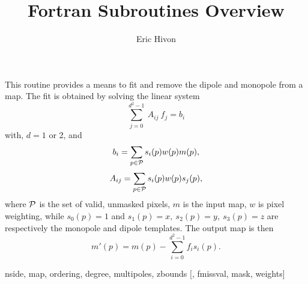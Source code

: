 
\sloppy


\title{\healpix Fortran Subroutines Overview}
 \section[remove\_dipole*]{ }
\label{sub:remove_dipole}
\author{Eric Hivon}
\newcommand{\vecf}{{\rm{ \bf f}}}
\newcommand{\vecb}{{\rm{ \bf b}}}
\newcommand{\matA}{{\rm{ \bf A}}}
\newcommand{\calP}{\cal{P}}

\begin{facility}
{This routine provides a means to fit and remove the dipole and monopole
from a \healpix map. The fit is obtained by solving the linear system
\begin{equation}
	\sum_{j=0}^{d^2-1}\ A_{ij}\ f_j = b_i
\end{equation}
 with, $d=1$ or 2, and
\begin{equation}
	b_i = \sum_{p \in \calP} s_i(p) w(p) m(p),
\end{equation}
\begin{equation}
	A_{ij} = \sum_{p \in \calP} s_i(p) w(p) s_j(p),
\end{equation}
 where $\calP$ is the set of
valid, unmasked pixels, $m$ is the input map, $w$ is pixel weighting, while
$s_0(p) = 1$ and $s_1(p)=x,\ s_2(p)=y,\ s_3(p)=z$ are
respectively the monopole and dipole templates. The output map is then
\begin{equation}
	m'(p) = m(p) - \sum_{i=0}^{d^2-1} f_i s_i(p).
\end{equation}
}
{\modPixTools}
\end{facility}

\begin{f90format}
{nside, map, ordering, degree, multipoles, zbounds [, fmissval, mask, weights]}
\end{f90format}

